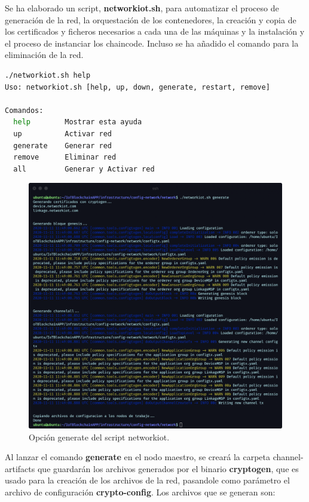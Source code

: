 \noindent Se ha elaborado un script, \textbf{networkiot.sh}, para automatizar el proceso de generación de la red, la 
orquestación de los contenedores, la creación y copia de los certificados y ficheros necesarios a cada una de las 
máquinas y la instalación y el proceso de instanciar los chaincode. Incluso se ha añadido el comando para la eliminación 
de la red. \cite{byfn, deploy-stack-swarm}

\vspace{5mm}

\begin{lstlisting}[language=bash]
./networkiot.sh help
Uso: networkiot.sh [help, up, down, generate, restart, remove]

Comandos:
  help        Mostrar esta ayuda
  up          Activar red
  generate    Generar red
  remove      Eliminar red
  all         Generar y Activar red
\end{lstlisting}

\begin{figure}[ht!]
  \centering
  \includegraphics[width=\textwidth]{imagenes/desarrollo/comandos/generate}
  \caption{Opción generate del script networkiot.}
  \label{fig:generate}
\end{figure}

\noindent Al lanzar el comando \textbf{generate} en el nodo maestro, se creará la carpeta channel-artifacts que 
guardarán los archivos generados por el binario \textbf{cryptogen}, que es usado para la creación de los archivos de la 
red, pasandole como parámetro el archivo de configuración \textbf{crypto-config}. Los archivos que se generan son:

